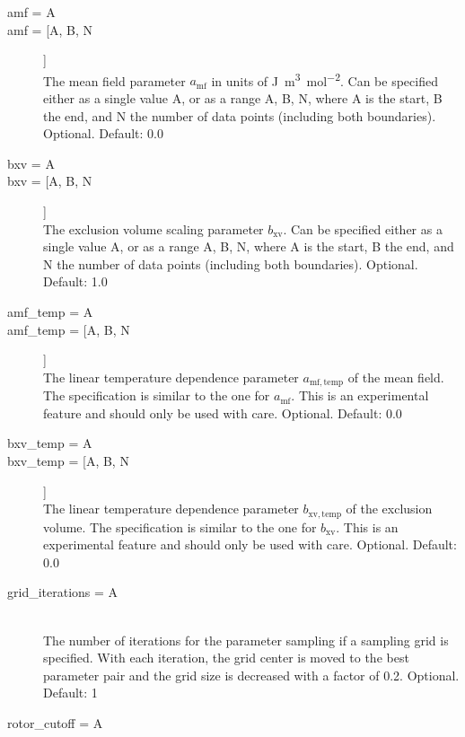 \documentclass{scrartcl}
\newcommand{\amf}{a_\mathrm{mf}}
\newcommand{\bxv}{b_\mathrm{xv}}
\begin{document}
\begin{description}
    \item[amf = A]
    \item[amf = [A, B, N]] \hfill \\
        The mean field parameter $\amf$ in units of \si{\joule\cubic\meter\per\mole\squared}.
        Can be specified either as a single value A, or as a range A, B, N, where A is the start, B the end, 
        and N the number of data points (including both boundaries).
        Optional. Default: 0.0
        \vspace{0.1cm}
    \item[bxv = A]
    \item[bxv = [A, B, N]] \hfill \\
        The exclusion volume scaling parameter $\bxv$.
        Can be specified either as a single value A, or as a range A, B, N, where A is the start, B the end, 
        and N the number of data points (including both boundaries).
        Optional. Default: 1.0
        \vspace{0.1cm}
    \item[amf\_temp = A]
    \item[amf\_temp = [A, B, N]] \hfill \\
        The linear temperature dependence parameter $a_\mathrm{mf,temp}$ of the mean field.
        The specification is similar to the one for $\amf$.
        This is an experimental feature and should only be used with care.
        Optional. Default: 0.0
        \vspace{0.1cm}
    \item[bxv\_temp = A]
    \item[bxv\_temp = [A, B, N]] \hfill \\
        The linear temperature dependence parameter $b_\mathrm{xv,temp}$ of the exclusion volume.
        The specification is similar to the one for $\bxv$.
        This is an experimental feature and should only be used with care.
        Optional. Default: 0.0
        \vspace{0.1cm}
    \item[grid\_iterations = A] \hfill \\
        The number of iterations for the parameter sampling if a sampling grid is specified.
        With each iteration, the grid center is moved to the best parameter pair and the grid size is decreased 
        with a factor of 0.2.
        Optional. Default: 1
    \item[rotor\_cutoff = A] \hfill \\

\end{description}
\end{document}
